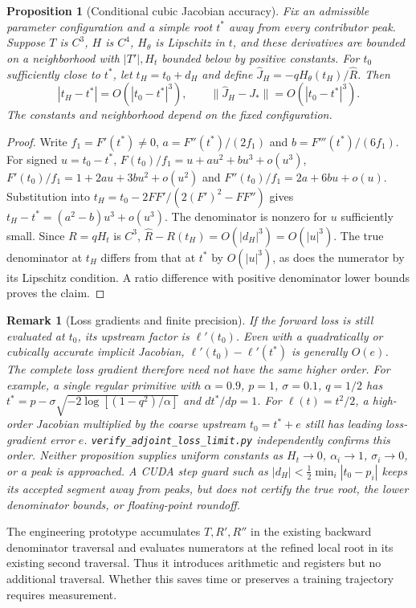 \documentclass[11pt,a4paper]{article}
\newtheorem{proposition}[theorem]{Proposition}
\newtheorem{remark}[theorem]{Remark}
\begin{document}
\begin{proposition}[Conditional cubic Jacobian accuracy]
Fix an admissible parameter configuration and a simple root $t^*$
away from every contributor peak. Suppose $T$ is $C^3$, $H$ is $C^4$,
$H_\theta$ is Lipschitz in $t$, and these derivatives are bounded on
a neighborhood with $|T'|,H_t$ bounded below by positive constants.
For $t_0$ sufficiently close to $t^*$, let $t_H=t_0+d_H$ and define
$\widehat J_H=-qH_\theta(t_H)/\widehat R$. Then
\[
 |t_H-t^*|=O(|t_0-t^*|^3),\qquad
 \|\widehat J_H-J_*\|=O(|t_0-t^*|^3).
\]
The constants and neighborhood depend on the fixed configuration.
\end{proposition}
\begin{proof}
Write $f_1=F'(t^*)\ne0$, $a=F''(t^*)/(2f_1)$ and
$b=F'''(t^*)/(6f_1)$. For signed $u=t_0-t^*$,
$F(t_0)/f_1=u+au^2+bu^3+o(u^3)$,
$F'(t_0)/f_1=1+2au+3bu^2+o(u^2)$ and
$F''(t_0)/f_1=2a+6bu+o(u)$. Substitution into
$t_H=t_0-2FF'/(2(F')^2-FF'')$ gives
$t_H-t^*=(a^2-b)u^3+o(u^3)$. The denominator is nonzero
for $u$ sufficiently small. Since $R=qH_t$ is $C^3$,
$\widehat R-R(t_H)=O(|d_H|^3)=O(|u|^3)$.
The true denominator at $t_H$ differs from that at $t^*$ by
$O(|u|^3)$, as does the numerator by its Lipschitz condition.
A ratio difference with positive denominator lower bounds proves the claim.
\end{proof}

\begin{remark}[Loss gradients and finite precision]
If the forward loss is still evaluated at $t_0$, its upstream factor
is $\ell'(t_0)$. Even with a quadratically or cubically accurate
implicit Jacobian, $\ell'(t_0)-\ell'(t^*)$ is generally $O(e)$.
The complete loss gradient therefore need not have the same higher order.
For example, a single regular primitive with $\alpha=0.9$, $p=1$,
$\sigma=0.1$, $q=1/2$ has
$t^*=p-\sigma\sqrt{-2\log[(1-q^2)/\alpha]}$ and $dt^*/dp=1$.
For $\ell(t)=t^2/2$, a high-order Jacobian multiplied by the coarse
upstream $t_0=t^*+e$ still has leading loss-gradient error $e$.
\texttt{verify\_adjoint\_loss\_limit.py} independently confirms this order.
Neither proposition supplies uniform constants as $H_t\to0$,
$\alpha_i\to1$, $\sigma_i\to0$, or a peak is approached.
A CUDA step guard such as $|d_H|<\tfrac12\min_i|t_0-p_i|$
keeps its accepted segment away from peaks, but does not certify the
true root, the lower denominator bounds, or floating-point roundoff.
\end{remark}

The engineering prototype accumulates $T,R',R''$ in the existing
backward denominator traversal and evaluates numerators at the refined
local root in its existing second traversal. Thus it introduces arithmetic
and registers but no additional traversal. Whether this saves time or
preserves a training trajectory requires measurement.
\end{document}
